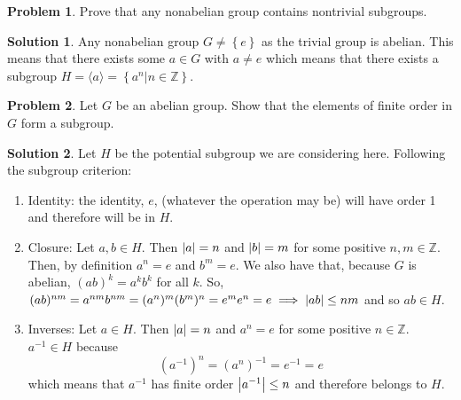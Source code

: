 \documentclass[10pt]{article}
\theoremstyle{definition}
\newtheorem{problem}{Problem}
\newtheorem{soln}{Solution}
\begin{document}
\begin{problem}
Prove that any nonabelian group contains nontrivial subgroups.
\end{problem}
\begin{soln}
  Any nonabelian group $G\neq \left\{e\right\}$ as the trivial group is abelian.
  This means that there exists some $a \in G$ with $a\neq e$ which means that there
  exists a subgroup $H=\langle a\rangle=\left\{a^n|n\in \mathbb{Z}\right\}$.
\end{soln}

\begin{problem}
Let $G$ be an abelian group. Show that the elements of finite order
in $G$ form a subgroup.
\end{problem}
\begin{soln}
  Let $H$ be the potential subgroup we are considering here. Following the subgroup criterion:
  \begin{enumerate}
    \item Identity: the identity, $e$, (whatever the operation may be) will have order 1 and therefore will be in $H$.
    \item Closure: Let $a,b\in H$. Then $\abs{a}=n$ and $\abs{b}=m$ for some positive $n,m\in \mathbb{Z}$.
          Then, by definition $a^n=e$ and $b^m=e$. We also have that, because $G$ is abelian, $(ab)^k=a^kb^k$ for all $k$.
          So, $(ab)^{nm}=a^{nm}b^{nm}=(a^n)^m(b^m)^n=e^me^n=e\implies \abs{ab}\leq nm$ and so $ab\in H$.
    \item Inverses: Let $a\in H$. Then $\abs{a}=n$ and $a^n=e$ for some positive $n\in \mathbb{Z}$.
          $a^{-1}\in H$ because
          $$(a^{-1})^n=(a^n)^{-1}=e^{-1}=e$$
          which means that $a^{-1}$ has finite order $\abs{a^{-1}}\leq n$ and therefore belongs to $H$.
  \end{enumerate}
\end{soln}
\end{document}
